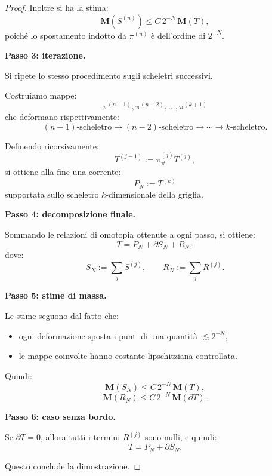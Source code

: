 \documentclass[a4paper,11pt]{article}
\theoremstyle{definition}
\begin{document}
\begin{proof}
Inoltre si ha la stima:
\[
\mathbf{M}(S^{(n)}) \le C\,2^{-N}\,\mathbf{M}(T),
\]
poiché lo spostamento indotto da $\pi^{(n)}$ è dell'ordine di $2^{-N}$.

\medskip

\noindent
\textbf{Passo 3: iterazione.}

Si ripete lo stesso procedimento sugli scheletri successivi.

Costruiamo mappe:
\[
\pi^{(n-1)}, \pi^{(n-2)}, \dots, \pi^{(k+1)}
\]
che deformano rispettivamente:
\[
(n-1)\text{-scheletro} \to (n-2)\text{-scheletro} \to \cdots \to k\text{-scheletro}.
\]

Definendo ricorsivamente:
\[
T^{(j-1)} := \pi^{(j)}_{\#} T^{(j)},
\]
si ottiene alla fine una corrente:
\[
P_N := T^{(k)}
\]
supportata sullo scheletro $k$-dimensionale della griglia.

\medskip

\noindent
\textbf{Passo 4: decomposizione finale.}

Sommando le relazioni di omotopia ottenute a ogni passo,
si ottiene:
\[
T = P_N + \partial S_N + R_N,
\]
dove:
\[
S_N := \sum_j S^{(j)}, \qquad R_N := \sum_j R^{(j)}.
\]

\medskip

\noindent
\textbf{Passo 5: stime di massa.}

Le stime seguono dal fatto che:
\begin{itemize}
\item ogni deformazione sposta i punti di una quantità $\lesssim 2^{-N}$,
\item le mappe coinvolte hanno costante lipschitziana controllata.
\end{itemize}

Quindi:
\[
\mathbf{M}(S_N) \le C\,2^{-N}\,\mathbf{M}(T),
\]
\[
\mathbf{M}(R_N) \le C\,2^{-N}\,\mathbf{M}(\partial T).
\]

\medskip

\noindent
\textbf{Passo 6: caso senza bordo.}

Se $\partial T = 0$, allora tutti i termini $R^{(j)}$ sono nulli,
e quindi:
\[
T = P_N + \partial S_N.
\]

\medskip

\noindent
Questo conclude la dimostrazione.
\end{proof}
\end{document}
